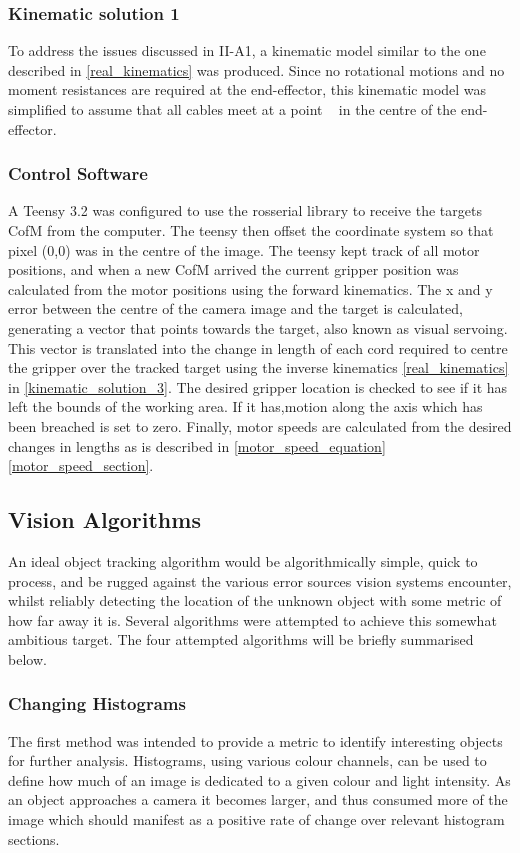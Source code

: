 \documentclass[conference]{IEEEtran}
\begin{document}
\subsubsection{Kinematic solution 1} \label{kinematic_solution_1}
To address the issues discussed in II-A1, a kinematic model similar to the one described in \ref{real_kinematics} was produced. Since no rotational motions and no moment resistances are required
at the end-effector, this kinematic model was simplified to assume that all cables meet at a point ~\cite{WilliamsII2003} in the centre of the end-effector.

\subsubsection{Control Software}
A Teensy 3.2 was configured to use the rosserial library to receive the targets CofM from the computer. The teensy then offset the coordinate system so that pixel (0,0) was in the centre of the image. The teensy kept track of all motor positions, and when a new CofM arrived the current gripper position was calculated from the motor positions using the forward kinematics. The x and y error between the centre of the camera image and the target is calculated, generating a vector that points towards the target, also known as visual servoing. This vector is translated into the change in length of each cord required to centre the gripper over the tracked target using the inverse kinematics \ref{real_kinematics} in \ref{kinematic_solution_3}. The desired gripper location is checked to see if it has left the bounds of the working area. If it has,motion along the axis which has been breached is set to zero. Finally, motor speeds are calculated from the desired changes in lengths as is described in \ref{motor_speed_equation} \ref{motor_speed_section}.

\subsection{Vision Algorithms}
An ideal object tracking algorithm would be algorithmically simple, quick to process, and be rugged against the various error sources vision systems encounter, whilst reliably detecting the location of the unknown object with some metric of how far away it is. Several algorithms were attempted to achieve this somewhat ambitious target. The four attempted algorithms will be briefly summarised below.

\subsubsection{Changing Histograms}
The first method was intended to provide a metric to identify interesting objects for further analysis. Histograms, using various colour channels, can be used to define how much of an image is dedicated to a given colour and light intensity. As an object approaches a camera it becomes larger, and thus consumed more of the image which should manifest as a positive rate of change over relevant histogram sections.
\end{document}
